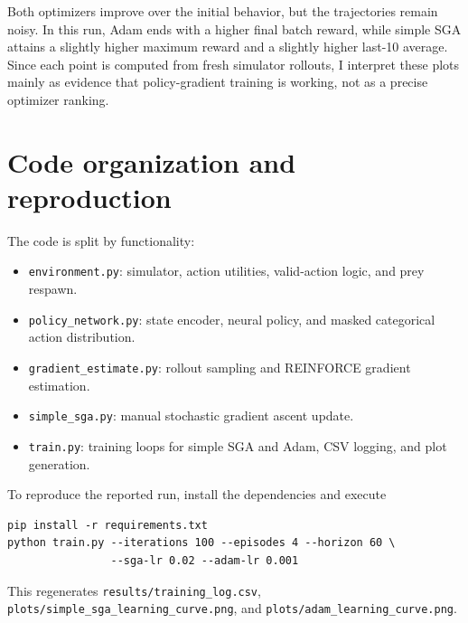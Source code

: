\documentclass[11pt,a4paper]{article}
\begin{document}
Both optimizers improve over the initial behavior, but the trajectories remain noisy. In this run, Adam ends with a higher final batch reward, while simple SGA attains a slightly higher maximum reward and a slightly higher last-10 average. Since each point is computed from fresh simulator rollouts, I interpret these plots mainly as evidence that policy-gradient training is working, not as a precise optimizer ranking.

\section{Code organization and reproduction}
The code is split by functionality:
\begin{itemize}[noitemsep]
    \item \texttt{environment.py}: simulator, action utilities, valid-action logic, and prey respawn.
    \item \texttt{policy\_network.py}: state encoder, neural policy, and masked categorical action distribution.
    \item \texttt{gradient\_estimate.py}: rollout sampling and REINFORCE gradient estimation.
    \item \texttt{simple\_sga.py}: manual stochastic gradient ascent update.
    \item \texttt{train.py}: training loops for simple SGA and Adam, CSV logging, and plot generation.
\end{itemize}

To reproduce the reported run, install the dependencies and execute
\begin{verbatim}
pip install -r requirements.txt
python train.py --iterations 100 --episodes 4 --horizon 60 \
                --sga-lr 0.02 --adam-lr 0.001
\end{verbatim}
This regenerates \texttt{results/training\_log.csv}, \texttt{plots/simple\_sga\_learning\_curve.png}, and \texttt{plots/adam\_learning\_curve.png}.
\end{document}
